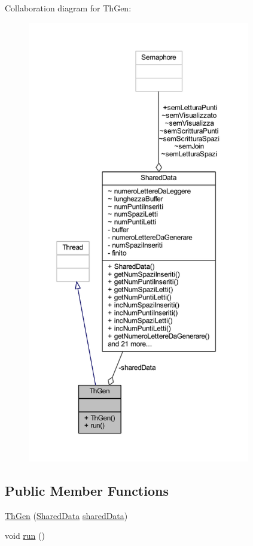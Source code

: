Collaboration diagram for Th\+Gen\+:
\nopagebreak
\begin{figure}[H]
\begin{center}
\leavevmode
\includegraphics[height=550pt]{classmain_1_1_th_gen__coll__graph}
\end{center}
\end{figure}
\subsection*{Public Member Functions}
\begin{DoxyCompactItemize}
\item 
\mbox{\hyperlink{classmain_1_1_th_gen_ab975ff8819d4ba6b00d6661950d14bb6}{Th\+Gen}} (\mbox{\hyperlink{classmain_1_1_shared_data}{Shared\+Data}} \mbox{\hyperlink{classmain_1_1_th_gen_a1cc1b8edddc4a6929213d3387b370bcd}{shared\+Data}})
\item 
void \mbox{\hyperlink{classmain_1_1_th_gen_a13a43e6d814de94978c515cb084873b1}{run}} ()
\end{DoxyCompactItemize}
